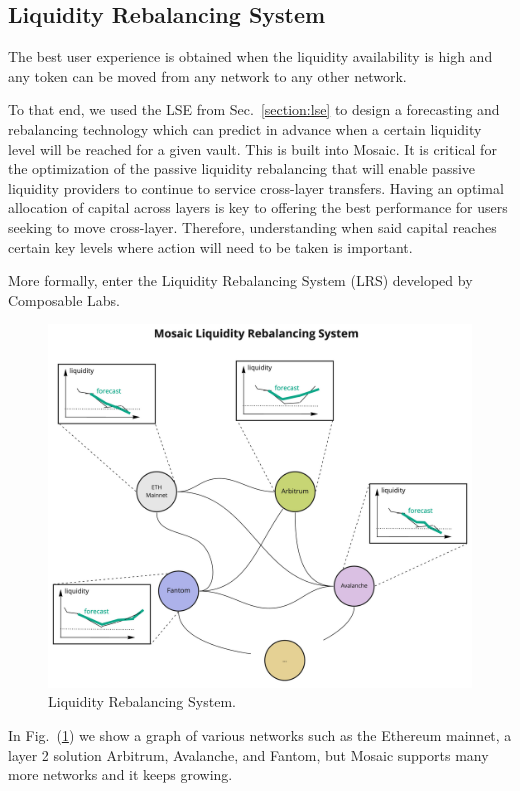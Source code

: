 \subsection{Liquidity Rebalancing System}\label{section:lrs}

The best user experience is obtained when the liquidity availability is high and any token can be moved from any network to any other network.

To that end, we used the LSE from Sec.~\ref{section:lse} to design a forecasting and rebalancing technology which can predict in advance when a certain liquidity level will be reached for a given vault. This is built into Mosaic.
%
It is critical for the optimization of the passive liquidity rebalancing that will enable passive liquidity providers to continue to service cross-layer transfers.
%
Having an optimal allocation of capital across layers is key to offering the best performance for users seeking to move cross-layer. Therefore, understanding when said capital reaches certain key levels where action will need to be taken is important.

More formally, enter the Liquidity Rebalancing System (LRS) developed by Composable Labs.
%
\begin{figure}
    \centering
    \includegraphics[scale=0.14]{images/lrs.jpg}
    \caption{Liquidity Rebalancing System.}
    \label{fig:lrs}
\end{figure}
%
In Fig.~(\ref{fig:lrs}) we show a graph of various networks such as the Ethereum mainnet, a layer 2 solution Arbitrum, Avalanche, and Fantom, but Mosaic supports many more networks and it keeps growing.

